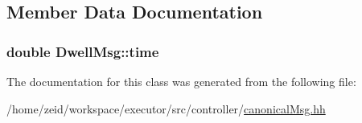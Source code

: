 \subsection{Member Data Documentation}
\hypertarget{class_dwell_msg_a33c85532f94bc20af83057d3220a94c5}{
\subsubsection[{time}]{\setlength{\rightskip}{0pt plus 5cm}double {\bf DwellMsg::time}}}
\label{class_dwell_msg_a33c85532f94bc20af83057d3220a94c5}


The documentation for this class was generated from the following file:\begin{DoxyCompactItemize}
\item 
/home/zeid/workspace/executor/src/controller/\hyperlink{canonical_msg_8hh}{canonicalMsg.hh}\end{DoxyCompactItemize}

